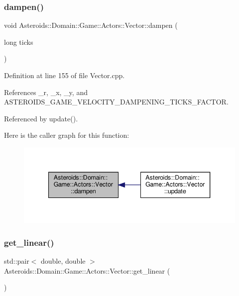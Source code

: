 \subsubsection{\texorpdfstring{dampen()}{dampen()}}
{\footnotesize\ttfamily void Asteroids\+::\+Domain\+::\+Game\+::\+Actors\+::\+Vector\+::dampen (\begin{DoxyParamCaption}\item[{long}]{ticks }\end{DoxyParamCaption})\hspace{0.3cm}{\ttfamily [private]}}



Definition at line 155 of file Vector.\+cpp.



References \+\_\+r, \+\_\+x, \+\_\+y, and A\+S\+T\+E\+R\+O\+I\+D\+S\+\_\+\+G\+A\+M\+E\+\_\+\+V\+E\+L\+O\+C\+I\+T\+Y\+\_\+\+D\+A\+M\+P\+E\+N\+I\+N\+G\+\_\+\+T\+I\+C\+K\+S\+\_\+\+F\+A\+C\+T\+OR.



Referenced by update().

Here is the caller graph for this function\+:\nopagebreak
\begin{figure}[H]
\begin{center}
\leavevmode
\includegraphics[width=340pt]{classAsteroids_1_1Domain_1_1Game_1_1Actors_1_1Vector_a7432d5e9efef0bbf2d64a53c410e2855_icgraph}
\end{center}
\end{figure}
\mbox{\label{classAsteroids_1_1Domain_1_1Game_1_1Actors_1_1Vector_aafa43064d8a1d74908e998a613836b83}} 
\subsubsection{\texorpdfstring{get\+\_\+linear()}{get\_linear()}}
{\footnotesize\ttfamily std\+::pair$<$ double, double $>$ Asteroids\+::\+Domain\+::\+Game\+::\+Actors\+::\+Vector\+::get\+\_\+linear (\begin{DoxyParamCaption}{ }\end{DoxyParamCaption})}



